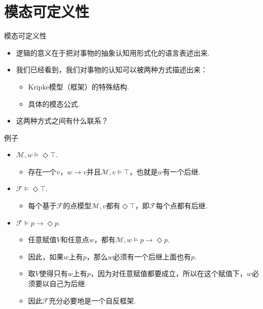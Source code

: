     \section{模态可定义性}
    \begin{frame}{模态可定义性}
    \begin{itemize}
        \item 逻辑的意义在于把对事物的抽象认知用形式化的语言表述出来.
        \item 我们已经看到，我们对事物的认知可以被两种方式描述出来：
        \begin{itemize}
            \item Kripke模型（框架）的特殊结构.
            \item 具体的模态公式.
        \end{itemize}
        \item 这两种方式之间有什么联系？
    \end{itemize}
    \end{frame}
    \begin{frame}{例子}
    \begin{itemize}
        \item $\mathcal M,w\vDash\Diamond\top$.
        \begin{itemize}
            \item 存在一个$v$，$w\to v$并且$\mathcal M,v\vDash\top$，也就是$w$有一个后继.
        \end{itemize}
        \item $\mathcal F\vDash\Diamond \top$.
        \begin{itemize}
            \item 每个基于$\mathcal F$的点模型$\mathcal M,v$都有$\Diamond \top$，即$\mathcal F$每个点都有后继.
        \end{itemize}
        \item $\mathcal F\vDash p\to\Diamond p$.
        \begin{itemize}
            \item 任意赋值$V$和任意点$w$，都有$\mathcal M,w\vDash p\to\Diamond p$.
            \item 因此，如果$w$上有$p$，那么$w$必须有一个后继上面也有$p$.
            \item  取$V$使得只有$w$上有$p$，因为对任意赋值都要成立，所以在这个赋值下，$w$必须要以自己为后继.
            \item 因此$\mathcal F$充分必要地是一个自反框架.
        \end{itemize}
    \end{itemize}
    \end{frame}
    
